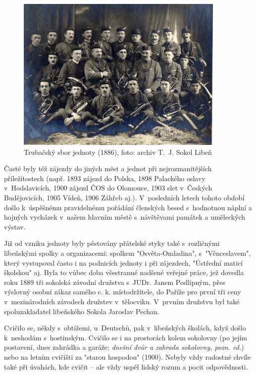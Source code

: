 \documentclass[a5paper, 11pt, twoside]{article}
\newcommand{\pozned}[1]{%
\textit{#1}}
\begin{document}
\begin{figure}[h!]
  \centering
   \includegraphics[width=0.9\textwidth]{img/06_trubaci.jpg}
  \caption*{Trubačský sbor jednoty (1886), foto: archiv T.~J. Sokol Libeň}
\end{figure}

Časté byly též zájezdy do jiných měst a jednot při nejrozmanitějších příležitostech (např. 1893 zájezd do Polska, 1898 Palackého oslavy v~Hodslavicích, 1900 zájezd ČOS do Olomouce, 1903 slet v~Českých Budějovicích, 1905 Vídeň, 1906 Záhřeb aj.). V~posledních letech tohoto období došlo k~úspěšnému pravidelnému pořádání členských besed s~hodnotnou náplní a hojných vycházek v~našem hlavním městě s~návštěvami památek a uměleckých výstav.

Již od vzniku jednoty byly pěstovány přátelské styky také s~rozličnými libeňskými spolky a organizacemi: spolkem "Osvěta-Omladina", s~"Věnceslavem", který vystupoval často i na podnicích jednoty i při zájezdech, "Ústřední maticí školskou" aj. Byla to vůbec doba všestranné nadšené veřejné práce, jež dovedla roku 1889 tři sokolská závodní družstva s~JUDr. Janem Podlipným, přes výslovný osobní zákaz samého c. k. místodržitele, do Paříže pro první tři ceny v~mezinárodních závodech družstev v~tělocviku. V~prvním družstvu byl také spoluzakladatel libeňského Sokola Jaroslav Pechan.

Cvičilo se, někdy s~obtížemi, u~Deutschů, pak v~libeňských školách, když došlo k~neshodám s~hostinským. Cvičilo se i na prostorách kolem sokolovny (po jejím postavení, dnes zahrádka a garáže; \pozned{dnešní dvůr a zahrada sokolovny, pozn. ed.}) nebo na letním cvičišti za "starou hospodou" (1900). Nebyly vždy radostné chvíle také při úvahách, kde cvičit – ale vždy uspěl lidský rozum a pocit odpovědnosti. 
\end{document}
